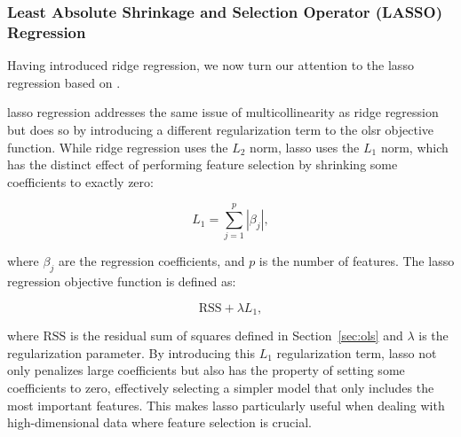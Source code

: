 \subsubsection{Least Absolute Shrinkage and Selection Operator (LASSO) Regression}
Having introduced ridge regression, we now turn our attention to the \gls{lasso} regression based on \citet{James2023AnIS}.

\gls{lasso} regression addresses the same issue of multicollinearity as ridge regression but does so by introducing a different regularization term to the \gls{olsr} objective function.
While ridge regression uses the $L_2$ norm, \gls{lasso} uses the $L_1$ norm, which has the distinct effect of performing feature selection by shrinking some coefficients to exactly zero:

$$
L_1 = \sum_{j=1}^{p} |\beta_j|,
$$

where $\beta_j$ are the regression coefficients, and $p$ is the number of features.
The \gls{lasso} regression objective function is defined as:

$$
\text{RSS} + \lambda L_1,
$$

where $\text{RSS}$ is the residual sum of squares defined in Section~\ref{sec:ols} and $\lambda$ is the regularization parameter.
By introducing this $L_1$ regularization term, \gls{lasso} not only penalizes large coefficients but also has the property of setting some coefficients to zero, effectively selecting a simpler model that only includes the most important features.
This makes \gls{lasso} particularly useful when dealing with high-dimensional data where feature selection is crucial.